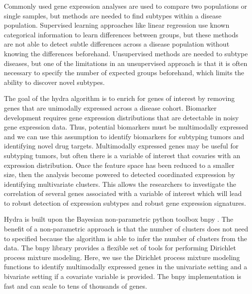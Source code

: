 \documentclass[fleqn,10pt]{wlscirep}
\begin{document}
Commonly used gene expression analyses are used to compare two populations or single samples, but methods are needed to find subtypes within a disease population. Supervised learning approaches like linear regression use known categorical information to learn differences between groups, but these methods are not able to detect subtle differences across a disease population without knowing the differences beforehand. Unsupervised methods are needed to subtype diseases, but one of the limitations in an unsupervised approach is that it is often necessary to specify the number of expected groups beforehand, which limits the ability to discover novel subtypes.

The goal of the hydra algorithm is to enrich for genes of interest by removing genes that are unimodally expressed across a disease cohort. Biomarker development requires gene expression distributions that are detectable in noisy gene expression data. Thus, potential biomarkers must be multimodally expressed and we can use this assumption to identify biomarkers for subtyping tumors and identifying novel drug targets. Multimodally expressed genes may be useful for subtyping tumors, but often there is a variable of interest that covaries with an expression distribution. Once the feature space has been reduced to a smaller size, then the analysis become powered to detected coordinated expression by identifying multivariate clusters. This allows the researchers to investigate the correlation of several genes associated with a variable of interest which will lead to robust detection of expression subtypes and robust gene expression signatures.

Hydra is built upon the Bayesian non-parametric python toolbox bnpy \cite{hughes2014bnpy}. The benefit of a non-parametric approach is that the number of clusters does not need to specified because the algorithm is able to infer the number of clusters from the data. The bnpy library provides a flexible set of tools for performing Dirichlet process mixture modeling. Here, we use the Dirichlet process mixture modeling functions to identify multimodally expressed genes in the univariate setting and a bivariate setting if a covariate variable is provided. The bnpy implementation is fast and can scale to tens of thousands of genes.
\end{document}
